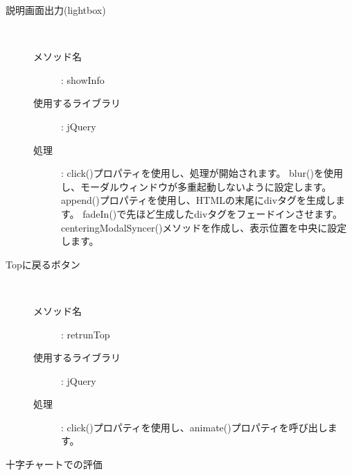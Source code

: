 \documentclass[a4j,titlepage]{jarticle}
\begin{document}
\begin{description}
\begin{description}
\item[説明画面出力(lightbox)]~
  \begin{description}
    \item [メソッド名] : showInfo
    \item [使用するライブラリ] : jQuery
    \item [処理] : click()プロパティを使用し、処理が開始されます。
    blur()を使用し、モーダルウィンドウが多重起動しないように設定します。
    append()プロパティを使用し、HTMLの末尾にdivタグを生成します。
    fadeIn()で先ほど生成したdivタグをフェードインさせます。
    centeringModalSyncer()メソッドを作成し、表示位置を中央に設定します。
  \end{description}

\item[Topに戻るボタン]~
  \begin{description}
    \item [メソッド名] : retrunTop
    \item [使用するライブラリ] : jQuery
    \item [処理] : click()プロパティを使用し、animate()プロパティを呼び出します。
  \end{description}


\item[十字チャートでの評価]~\\


\end{description}
\end{description}
\end{document}
